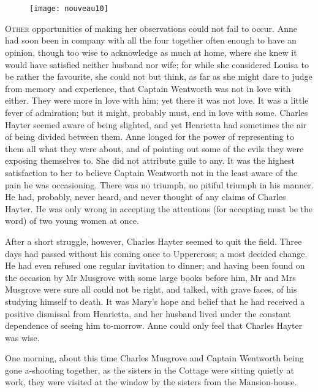\chapter[Chapter \thechapter]{}

\begin{figure}[t!]
\centering
\texttt{[image: nouveau10]}
\end{figure}

\lettrine[lraise=0.3]{O}{ther} opportunities of making her observations could not fail to occur. Anne had soon been in company with all the four together often enough to have an opinion, though too wise to acknowledge as much at home, where she knew it would have satisfied neither husband nor wife; for while she considered Louisa to be rather the favourite, she could not but think, as far as she might dare to judge from memory and experience, that Captain Wentworth was not in love with either. They were more in love with him; yet there it was not love. It was a little fever of admiration; but it might, probably must, end in love with some. Charles Hayter seemed aware of being slighted, and yet Henrietta had sometimes the air of being divided between them. Anne longed for the power of representing to them all what they were about, and of pointing out some of the evils they were exposing themselves to. She did not attribute guile to any. It was the highest satisfaction to her to believe Captain Wentworth not in the least aware of the pain he was occasioning. There was no triumph, no pitiful triumph in his manner. He had, probably, never heard, and never thought of any claims of Charles Hayter. He was only wrong in accepting the attentions (for accepting must be the word) of two young women at once.

After a short struggle, however, Charles Hayter seemed to quit the field. Three days had passed without his coming once to Uppercross; a most decided change. He had even refused one regular invitation to dinner; and having been found on the occasion by Mr Musgrove with some large books before him, Mr and Mrs Musgrove were sure all could not be right, and talked, with grave faces, of his studying himself to death. It was Mary's hope and belief that he had received a positive dismissal from Henrietta, and her husband lived under the constant dependence of seeing him to-morrow. Anne could only feel that Charles Hayter was wise.

One morning, about this time Charles Musgrove and Captain Wentworth being gone a-shooting together, as the sisters in the Cottage were sitting quietly at work, they were visited at the window by the sisters from the Mansion-house.

